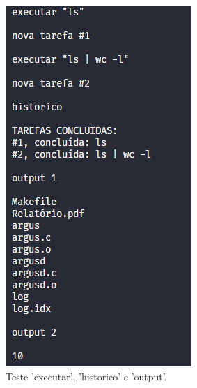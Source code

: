 \documentclass[a4paper]{report}
\begin{document}
	\begin{figure}[H]
		\centering
		\begin{subfigure}{.3\textwidth}
			\centering
			\includegraphics[width=.9\linewidth]{teste1.png}
			\caption{Teste 'executar', 'historico' e 'output'.}
			\label{fig:test1}
		\end{subfigure}
		\begin{subfigure}{.3\textwidth}
			\centering

\end{subfigure}
\end{figure}
\end{document}
